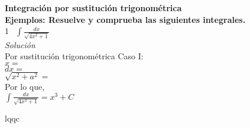 \documentclass[12pt,a4paper]{article}
\begin{document}
{\bf Integración por sustitución trigonométrica}\\

{\bf Ejemplos: Resuelve y comprueba las siguientes integrales.}\\

\textcircled{1}\ $\displaystyle{\int\frac{dx}{\sqrt{4x^2+1}}}$\\

{\it Solución}\\

Por sustitución trigonométrica Caso I:\\
$x=$\\
$dx=$\\
$\sqrt{x^2+a^2}=$\\

Por lo que,\\
$\displaystyle{\int\frac{dx}{\sqrt{4x^2+1}}}=x^3+C$\\
\begin{flushright}
lqqc
\end{flushright}
\end{document}
